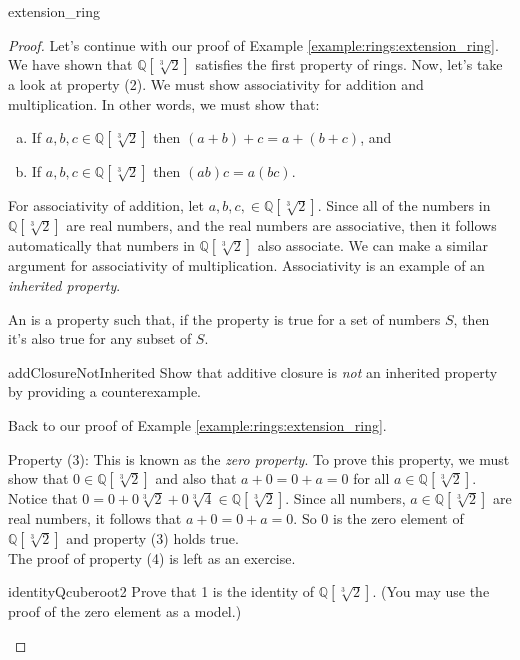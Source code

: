 \begin{example}{extension_ring}
\begin{proof}
Let's continue with our proof of Example \ref{example:rings:extension_ring}. We have shown that ${\mathbb Q}[\sqrt[3]{2}]$ satisfies the first property of rings. Now, let's take a look at property (2). We must show associativity for addition and multiplication. In other words, we must show that:
\begin{enumerate}[(a)]
\item If $a,b,c\in{\mathbb Q}[\sqrt[3]{2}]$ then $(a+b)+c=a+(b+c)$, and
\item If $a,b,c\in{\mathbb Q}[\sqrt[3]{2}]$ then $(ab)c=a(bc)$.
\end{enumerate}

For associativity of addition, let $a,b,c,\in{\mathbb Q}[ \sqrt[3]{2}]$. Since all of the numbers in ${\mathbb Q}[\sqrt[3]{2}]$ are real numbers, and the real numbers are associative, then it follows automatically that numbers in ${\mathbb Q}[\sqrt[3]{2}]$ also associate.  We can make a similar argument for associativity of multiplication.  Associativity is an example of an \emph{inherited property}.

\begin{defn}\label{def:inherited property}
An  is a property such that, if the property is true for a set of numbers $S$, then it's also true for any subset of $S$.
\end{defn}

\begin{exercise}{addClosureNotInherited}
Show that additive closure is \emph{not} an inherited property by providing a counterexample.
\end{exercise}{}

Back to our proof of Example \ref{example:rings:extension_ring}.

Property (3): This is known as the \emph{zero property}. To prove this property, we must show that $0\in{\mathbb Q}[\sqrt[3]{2}]$ and also that $a+0=0+a=0$ for all $a\in{\mathbb Q}[\sqrt[3]{2}]$. Notice that $0=0+0\sqrt[3]{2}+0\sqrt[3]{4}\in{\mathbb Q}[\sqrt[3]{2}]$. Since all numbers, $a\in{\mathbb Q}[\sqrt[3]{2}]$ are real numbers, it follows that $a+0=0+a=0$. So $0$ is the zero element of ${\mathbb Q}[\sqrt[3]{2}]$ and property (3) holds true.\\

The proof of property (4) is left as an exercise.

\begin{exercise}{identityQcuberoot2}
Prove that 1 is the identity of ${\mathbb Q}[\sqrt[3]{2}]$. (You may use the proof of the zero element as a model.)  
\end{exercise}{}


\end{proof}
\end{example}
